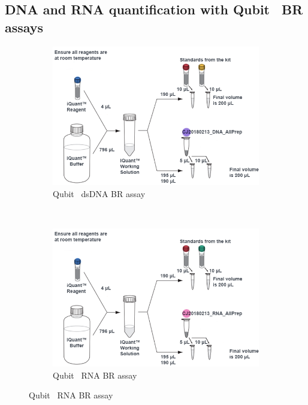 \subsection{DNA and RNA quantification with Qubit\texttrademark~ BR assays}
\label{task:20180213_cj3}

\begin{figure}[H] %
    \centering
    \caption{Illustration for the Qubit\texttrademark~ assays}
    \label{fig:20180213_Qubit_assays}
    \begin{subfigure}[b]{0.49\textwidth}
        \includegraphics[width=\textwidth]{graphics/schemas/20180213_Qubit_assay_DNA.png}
        \caption{Qubit\texttrademark~ dsDNA BR assay}
        \label{sfig:20180213_Qubit_assay_DNA}
    \end{subfigure}
    ~ 
    \begin{subfigure}[b]{0.49\textwidth}
        \includegraphics[width=\textwidth]{graphics/schemas/20180213_Qubit_assay_RNA.png}
        \caption{Qubit\texttrademark~ RNA BR assay}
        \label{sfig:20180213_Qubit_assay_RNA}
    \end{subfigure}
\end{figure}

